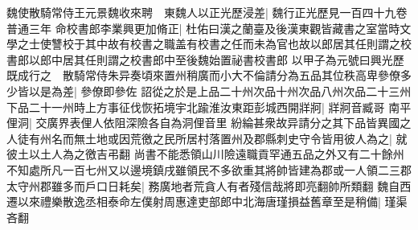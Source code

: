 魏使散騎常侍王元景魏收來聘　東魏人以正光歷浸差|{
	魏行正光歷見一百四十九卷普通三年}
命校書郎李業興更加脩正|{
	杜佑曰漢之蘭臺及後漢東觀皆藏書之室當時文學之士使讐校于其中故有校書之職盖有校書之任而未為官也故以郎居其任則謂之校書郎以郎中居其任則謂之校書郎中至後魏始置祕書校書郎}
以甲子為元號曰興光歷既成行之　散騎常侍朱异奏頃來置州稍廣而小大不倫請分為五品其位秩高卑參僚多少皆以是為差|{
	參僚即參佐}
詔從之於是上品二十州次品十州次品八州次品二十三州下品二十一州時上方事征伐恢拓境宇北踰淮汝東距彭城西開牂牁|{
	牂牁音臧哥}
南平俚洞|{
	交廣界表俚人依阻深險各自為洞俚音里}
紛綸甚衆故异請分之其下品皆異國之人徒有州名而無土地或因荒徼之民所居村落置州及郡縣刺史守令皆用彼人為之|{
	就彼土以土人為之徼吉弔翻}
尚書不能悉領山川險遠職貢罕通五品之外又有二十餘州不知處所凡一百七州又以邊境鎮戌雖領民不多欲重其將帥皆建為郡或一人領二三郡太守州郡雖多而戶口日耗矣|{
	務廣地者荒貪人有者殘信哉將即亮翻帥所類翻}
魏自西遷以來禮樂散逸丞相泰命左僕射周惠達吏部郎中北海唐瑾損益舊章至是稍備|{
	瑾渠吝翻}


